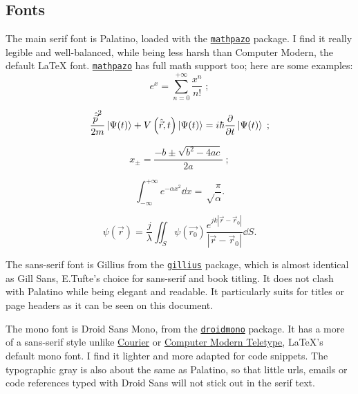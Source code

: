\documentclass[raggedright, twoside, 11pt, colorful]{tufte-style-article}
\begin{document}
\subsection{Fonts}

The main serif font is Palatino, loaded with the \href{www.ctan.org/pkg/mathpazo}{\texttt{mathpazo}} package. I find it really legible and well-balanced, while being less harsh than Computer Modern, the default \LaTeX{} font. \href{www.ctan.org/pkg/mathpazo}{\texttt{mathpazo}} has full math support too; here are some examples:
$$
e^x = \sum_{n=0}^{+\infty} \frac{x^n}{n!} \;;
$$

$$
\frac{{\hat{\vec p}}^2}{2m}\ket{\Psi(t)} + V\left(\hat{\vec r},t\right)\ket{\Psi(t)} = i\hbar \pdv{}{t}\ket{\Psi(t)} \;;
$$

$$
x_\pm = \frac{-b \pm \sqrt{b^2 - 4ac}}{2a}\;;
$$

$$
\int_{-\infty}^{+\infty} e^{-\alpha x^2} \dd{x} = \sqrt\frac{\pi}{\alpha}.
$$

\begin{equation}
\psi(\vec r) = \frac{j}{\lambda} \iint_S \psi(\vec{r_0})\frac{e^{jk|\vec r - \vec r_0|}}{|\vec r - \vec r_0|}\dd S.
\end{equation}

\begingroup\sffamily
The sans-serif font is Gillius from the \href{www.ctan.org/pkg/gillius}{\texttt{gillius}} package, which is almost identical as Gill Sans, E.Tufte's choice for sans-serif and book titling. It does not clash with Palatino while being elegant and readable. It particularly suits for titles or page headers as it can be seen on this document.
\endgroup

\begingroup\ttfamily
The mono font is Droid Sans Mono, from the \href{www.ctan.org/pkg/droid}{\texttt{droidmono}} package. It has a more of a sans-serif style unlike \href{www.ctan.org/tex-archive/fonts/psfonts/psnfss-source/courier}{Courier} or \href{www.ctan.org/tex-archive/fonts/cm/}{Computer Modern Teletype}, \LaTeX{}'s default mono font. I find it lighter and more adapted for code snippets. The typographic gray is also about the same as Palatino, so that little urls, emails or code references typed with Droid Sans will not stick out in the serif text.
\endgroup
\end{document}
